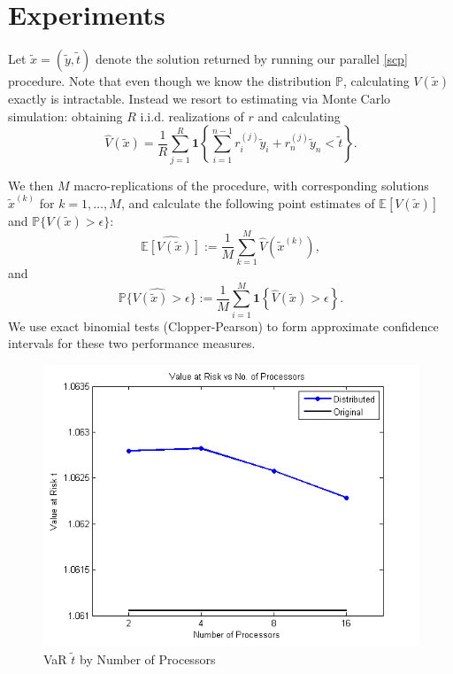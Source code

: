 \documentclass[12pt]{article}
\begin{document}
\section*{Experiments}
Let $\tilde{x} = (\tilde{y}, \tilde{t})$ denote the solution returned by running our parallel \ref{scp} procedure.
Note that even though we know the distribution $\mathbb{P}$, calculating $V(\tilde{x})$ exactly is intractable.
Instead we resort to estimating via Monte Carlo simulation: obtaining $R$ i.i.d. realizations of $r$ and calculating
\[ \hat{V}(\tilde{x}) = \frac{1}{R} \sum_{j = 1}^R \mathbf{1}\left\{ \sum_{i=1}^{n-1} r_i^{(j)} \tilde{y}_i + r_n^{(j)} \tilde{y}_n < \tilde{t}\right\}. \]

We then $M$ macro-replications of the procedure, with corresponding solutions $\tilde{x}^{(k)}$ for $k = 1, \ldots, M$, and calculate the following point estimates of $\mathbb{E}[V(\tilde{x})]$ and $\mathbb{P}\{V(\tilde{x}) > \epsilon\}$:
\[ \widehat{\mathbb{E}[V(\tilde{x})]} := \frac{1}{M} \sum_{k=1}^M \hat{V}(\tilde{x}^{(k)}), \]
and
\[ \widehat{\mathbb{P}\{V(\tilde{x}) > \epsilon\}} := \frac{1}{M} \sum_{i=1}^M \mathbf{1}\left\{\hat{V}(\tilde{x}) > \epsilon\right\}. \]
We use exact binomial tests (Clopper-Pearson) to form approximate confidence intervals for these two performance measures.

\begin{figure}[ht]
	\centering
		\includegraphics{../plot/figs/objfnval_num_proc.png}
	\caption{VaR $\tilde{t}$ by Number of Processors}
	\label{fig:objfnval_num_proc}
\end{figure}
\end{document}
